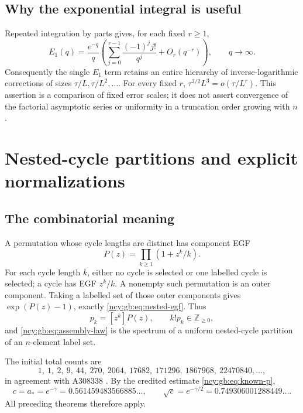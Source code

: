 \documentclass[11pt,letterpaper]{article}
\numberwithin{equation}{section}
\theoremstyle{remark}\newtheorem{remark}[theorem]{Remark}
\theoremstyle{definition}\newtheorem{definition}[theorem]{Definition}\theoremstyle{plain}
\newcommand{\Z}{\mathbb Z}
\begin{document}
\subsection{Why the exponential integral is useful}

Repeated integration by parts gives, for each fixed \(r\ge1\),
\[
 E_1(q)=\frac{e^{-q}}q
 \left(\sum_{j=0}^{r-1}\frac{(-1)^j j!}{q^j}
       +O_r(q^{-r})\right),\qquad q\to\infty.
\]
Consequently the single \(E_1\) term retains an entire hierarchy
of inverse-logarithmic corrections of sizes
\(\tau/L,\tau/L^2,\ldots\).
For every fixed \(r\),
\(\tau^{3/2}L^3=o(\tau/L^r)\).
This assertion is a comparison of fixed error scales; it does
not assert convergence of the factorial asymptotic series or
uniformity in a truncation order growing with \(n\).

\section{Nested-cycle partitions and explicit normalizations}
\label{ncy:gb:sec:application}

\subsection{The combinatorial meaning}

A permutation whose cycle lengths are distinct has component
EGF
\[
 P(z)=\prod_{k\ge1}(1+z^k/k).
\]
For each cycle length \(k\), either no cycle is selected or one
labelled cycle is selected; a cycle has EGF \(z^k/k\).
A nonempty such permutation is an outer component. Taking a
labelled set of those outer components gives
\(\exp(P(z)-1)\), exactly \eqref{ncy:gb:eq:nested-egf}.
Thus
\[
 p_k=[z^k]P(z),\qquad k!p_k\in\Z_{\ge0},
\]
and \eqref{ncy:gb:eq:assembly-law} is the spectrum of a uniform
nested-cycle partition of an \(n\)-element label set.

The initial total counts are
\[
 1,\ 1,\ 2,\ 9,\ 44,\ 270,\ 2064,\ 17682,\ 171296,\ 1867968,
 \ 22470840,\ldots,
\]
in agreement with A308338 \cite{oeis308338}.
By the credited estimate \eqref{ncy:gb:eq:known-p},
\begin{equation}\label{ncy:gb:eq:cycle-constants}
 c=a_*=e^{-\gamma}=0.561459483566885\ldots,\qquad
 \sqrt c=e^{-\gamma/2}=0.749306001288449\ldots.
\end{equation}
All preceding theorems therefore apply.
\end{document}
